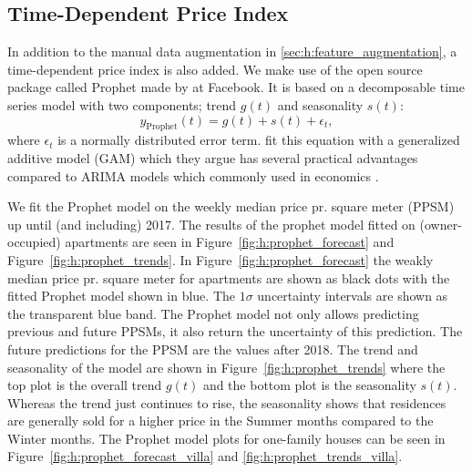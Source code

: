 \subsection{Time-Dependent Price Index}

In addition to the manual data augmentation in \autoref{sec:h:feature_augmentation}, a time-dependent price index is also added. We make use of the open source package called Prophet made by \citet{taylorForecastingScale} at Facebook. It is based on a decomposable time series model \autocite{harveyEstimationProceduresStructural1990} with two components; trend $g(t)$ and seasonality $s(t)$:
\begin{equation}
  y_\mathrm{Prophet}(t) = g(t) + s(t) + \epsilon_t,
\end{equation}
where $\epsilon_t$ is a normally distributed error term. \citet{taylorForecastingScale} fit this equation with a generalized additive model (GAM) \autocite{hastieGeneralizedAdditiveModels1987} which they argue has several practical advantages compared to ARIMA  models which commonly used in economics \autocite{nla.cat-vn1067782}. 

We fit the Prophet model on the weekly median price pr. square meter (PPSM) up until (and including) \num{2017}. The results of the prophet model fitted on (owner-occupied) apartments are seen in Figure~\ref{fig:h:prophet_forecast} and Figure~\ref{fig:h:prophet_trends}. In Figure~\ref{fig:h:prophet_forecast} the weakly median price pr. square meter for apartments are shown as black dots with the fitted Prophet model shown in blue. The $1\sigma$ uncertainty intervals are shown as the transparent blue band. The Prophet model not only allows predicting previous and future PPSMs, it also return the uncertainty of this prediction. The future predictions for the PPSM are the values after 2018. The trend and seasonality of the model are shown in Figure~\ref{fig:h:prophet_trends} where the top plot is the overall trend $g(t)$ and the bottom plot is the seasonality $s(t)$. Whereas the trend just continues to rise, the seasonality shows that residences are generally sold for a higher price in the Summer months compared to the Winter months. 
The Prophet model plots for one-family houses can be seen in Figure~\ref{fig:h:prophet_forecast_villa} and \ref{fig:h:prophet_trends_villa}. 

